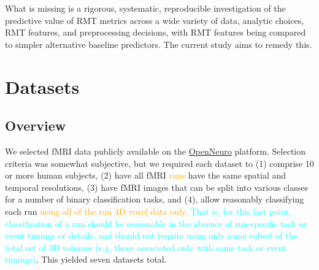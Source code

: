 \documentclass[12pt]{spieman}  %
\begin{document}
\begin{spacing}{2}
What is missing is a rigorous, systematic, reproducible investigation of the
predictive value of RMT metrics across a wide variety of data, analytic
choices, RMT features, and preprocessing decisions, with RMT features being
compared to simpler alternative baseline predictors. The current study aims to
remedy this.


\section{Datasets}
\label{sec:datasets}

\subsection{Overview}

We selected fMRI data publicly available on the
\href{https://openneuro.org/}{OpenNeuro}
platform\cite{markiewiczOpenNeuroResourceSharing2021}. Selection criteria was
somewhat subjective, but we required each dataset to (1) comprise 10 or more
human subjects, (2) have all fMRI \textcolor{orange}{runs} have the same
spatial and temporal resolutions, (3) have fMRI images that can be split into
various classes for a number of binary classification tasks, and (4), allow
reasonably classifying each run \textcolor{orange}{using all of the run 4D
voxel data only.} \textcolor{cyan}{That is, for this last point, classification
of a run should be reasonable in the absence of run-specific task or event
timings or details, and should not require using only some subset of the total
set of 3D volumes (e.g. those associated only with some task or event
timings)}. This yielded seven datasets total.



\end{spacing}
\end{document}
